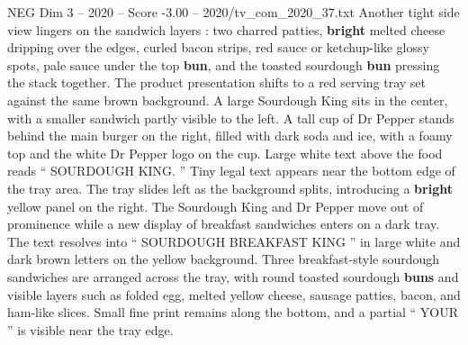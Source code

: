 \begin{textsample}{NEG Dim 3 – 2020 – Score -3.00 – 2020/tv\_com\_2020\_37.txt}
Another tight side view lingers on the sandwich layers : two charred patties, \textbf{bright} melted cheese dripping over the edges, curled bacon strips, red sauce or ketchup-like glossy spots, pale sauce under the top \textbf{bun}, and the toasted sourdough \textbf{bun} pressing the stack together.
The product presentation shifts to a red serving tray set against the same brown background.
A large Sourdough King sits in the center, with a smaller sandwich partly visible to the left.
A tall cup of Dr Pepper stands behind the main burger on the right, filled with dark soda and ice, with a foamy top and the white Dr Pepper logo on the cup.
Large white text above the food reads “ SOURDOUGH KING. ” Tiny legal text appears near the bottom edge of the tray area.
The tray slides left as the background splits, introducing a \textbf{bright} yellow panel on the right.
The Sourdough King and Dr Pepper move out of prominence while a new display of breakfast sandwiches enters on a dark tray.
The text resolves into “ SOURDOUGH BREAKFAST KING ” in large white and dark brown letters on the yellow background.
Three breakfast-style sourdough sandwiches are arranged across the tray, with round toasted sourdough \textbf{buns} and visible layers such as folded egg, melted yellow cheese, sausage patties, bacon, and ham-like slices.
Small fine print remains along the bottom, and a partial “ YOUR ” is visible near the tray edge.

\end{textsample}
